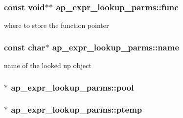 \subsubsection[{\texorpdfstring{func}{func}}]{\setlength{\rightskip}{0pt plus 5cm}const {\bf void}$\ast$$\ast$ ap\+\_\+expr\+\_\+lookup\+\_\+parms\+::func}\hypertarget{structap__expr__lookup__parms_a75cf93f0a5f586e2487c451718b78f1e}{}\label{structap__expr__lookup__parms_a75cf93f0a5f586e2487c451718b78f1e}
where to store the function pointer 
\subsubsection[{\texorpdfstring{name}{name}}]{\setlength{\rightskip}{0pt plus 5cm}const char$\ast$ ap\+\_\+expr\+\_\+lookup\+\_\+parms\+::name}\hypertarget{structap__expr__lookup__parms_a57dd99d90307bd478219eb051feaa3a4}{}\label{structap__expr__lookup__parms_a57dd99d90307bd478219eb051feaa3a4}
name of the looked up object 
\subsubsection[{\texorpdfstring{pool}{pool}}]{$\ast$ ap\+\_\+expr\+\_\+lookup\+\_\+parms\+::pool}\hypertarget{structap__expr__lookup__parms_a43b9d610979cae341aaf599df010ba80}{}\label{structap__expr__lookup__parms_a43b9d610979cae341aaf599df010ba80}
\subsubsection[{\texorpdfstring{ptemp}{ptemp}}]{$\ast$ ap\+\_\+expr\+\_\+lookup\+\_\+parms\+::ptemp}\hypertarget{structap__expr__lookup__parms_ac0c513ab310bbd3d193ef2c7cccd4b08}{}\label{structap__expr__lookup__parms_ac0c513ab310bbd3d193ef2c7cccd4b08}
